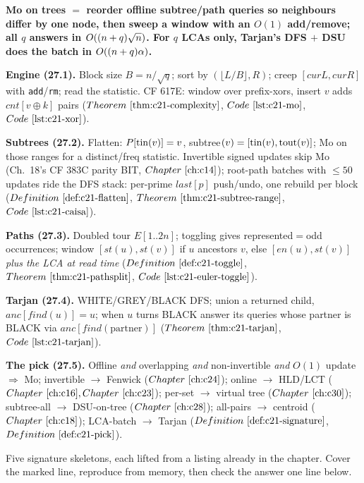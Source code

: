 \begin{quickref}
\textbf{Mo on trees \(=\) reorder offline subtree/path queries so neighbours differ
by one node, then sweep a window with an \(O(1)\) add/remove; all \(q\) answers in
\(O((n+q)\sqrt n)\). For \(q\) LCAs only, Tarjan's DFS \(+\) DSU does the batch
in \(O((n+q)\alpha)\).}

\medskip
\textbf{Engine (27.1).} Block size \(B=n/\sqrt q\); sort by
\((\lfloor L/B\rfloor,R)\); creep \([curL,curR]\) with \texttt{add}/\texttt{rm};
read the statistic. CF 617E: window over prefix-xors, insert \(v\) adds
\(cnt[v\oplus k]\) pairs (\(\thmref{c21-complexity}\), \(\coderef{c21-mo}\),
\(\coderef{c21-xor}\)).

\medskip
\textbf{Subtrees (27.2).} Flatten: \(P[\operatorname{tin}(v)]=v\), subtree\((v)=[\operatorname{tin}(v),\operatorname{tout}(v)]\);
Mo on those ranges for a distinct/freq statistic. Invertible signed updates skip Mo
(Ch.~18's CF 383C parity BIT, \(\chref{c14}\)); root-path batches with \(\le50\)
updates ride the DFS stack: per-prime \(\mathit{last}[p]\) push/undo, one rebuild per
block (\(\defref{c21-flatten}\), \(\thmref{c21-subtree-range}\),
\(\coderef{c21-caisa}\)).

\medskip
\textbf{Paths (27.3).} Doubled tour \(E[1..2n]\); toggling gives represented\(=\)odd
occurrences; window \([st(u),st(v)]\) if \(u\) ancestors \(v\), else \([en(u),st(v)]\)
\emph{plus the LCA at read time} (\(\defref{c21-toggle}\), \(\thmref{c21-pathsplit}\),
\(\coderef{c21-euler-toggle}\)).

\medskip
\textbf{Tarjan (27.4).} WHITE/GREY/BLACK DFS; union a returned child,
\(\mathit{anc}[\mathit{find}(u)]=u\); when \(u\) turns BLACK answer its queries whose
partner is BLACK via \(\mathit{anc}[\mathit{find}(\text{partner})]\)
(\(\thmref{c21-tarjan}\), \(\coderef{c21-tarjan}\)).

\medskip
\textbf{The pick (27.5).} Offline \emph{and} overlapping \emph{and} non-invertible
\emph{and} \(O(1)\) update \(\Rightarrow\) Mo; invertible \(\to\) Fenwick
(\(\chref{c24}\)); online \(\to\) HLD/LCT (\(\chref{c16},\chref{c23}\)); per-set
\(\to\) virtual tree (\(\chref{c30}\)); subtree-all \(\to\) DSU-on-tree
(\(\chref{c28}\)); all-pairs \(\to\) centroid (\(\chref{c18}\)); LCA-batch \(\to\)
Tarjan (\(\defref{c21-signature}\), \(\defref{c21-pick}\)).
\end{quickref}


Five signature skeletons, each lifted from a listing already in the chapter. Cover the
marked line, reproduce from memory, then check the answer one line below.

